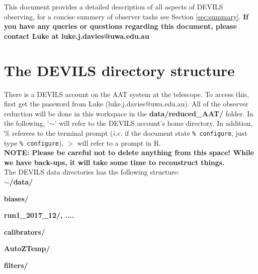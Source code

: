 \documentclass[12pt]{article}
\begin{document}
This document provides a detailed description of all aspects of DEVILS observing, for a concise summery of observer tasks see Section \ref{sec:summary}. \textcolor{PineGreen}{\textbf{If you have any queries or questions regarding this document, please contact Luke at luke.j.davies@uwa.edu.au}}\\

     
\section{The DEVILS directory structure}


There is a DEVILS account on the AAT system at the telescope. To access this, first get the password from Luke (luke.j.davies@uwa.edu.au). All of the observer reduction will be done in this workspace in the \textbf{data/reduced\_AAT/} folder. In the following, `$\sim$' will refer to the DEVILS account's home directory. In addition, \% referees to the terminal prompt ($i.e.$ if the document state \texttt{\% configure}, just type \texttt{\% configure}), $>$ will refer to a prompt in R. \\

\textcolor{PineGreen}{\textbf{NOTE: Please be careful not to delete anything from this space! While we have back-ups, it will take some time to reconstruct things.}}\\

The DEVILS data directories has the following structure:\\

\hspace{5mm} \textbf{$\sim$/data/} 
\vspace{1mm}

\hspace{10mm} \textbf{biases/}
\vspace{1mm}

\hspace{15mm} \textbf{run1\_2017\_12/, ....} 
\vspace{1mm}

\hspace{10mm} \textbf{calibrators/} 
\vspace{1mm}

\hspace{15mm} \textbf{AutoZTemp/} 
\vspace{1mm}

\hspace{15mm} \textbf{filters/} 
\vspace{1mm}
\end{document}
